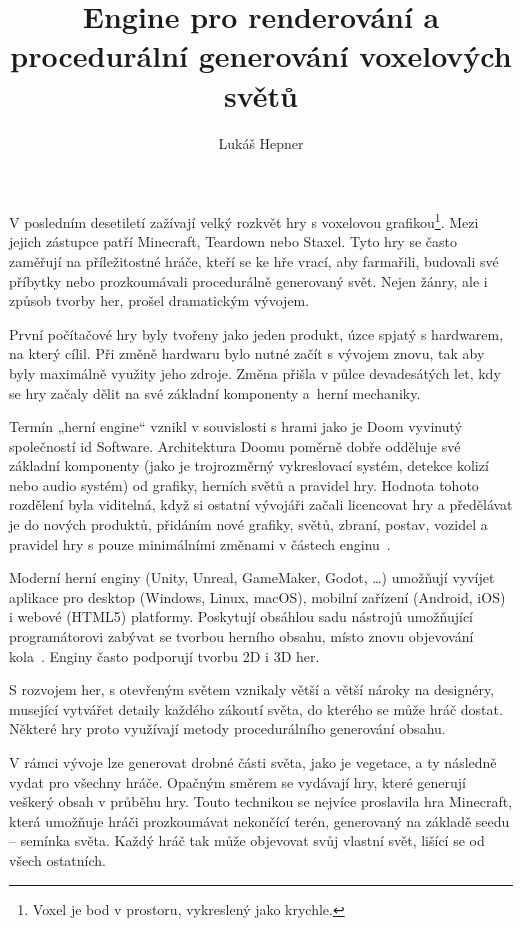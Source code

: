 \documentclass[thesis=M,czech]{FITthesis}[2019/12/23]
\title{Engine pro renderování a procedurální generování voxelových světů}
\author{Lukáš Hepner} %
\begin{document}

\begin{introduction}
V posledním desetiletí zažívají velký rozkvět hry s voxelovou grafikou\footnote{Voxel je bod v prostoru, vykreslený jako krychle.}. Mezi jejich zástupce patří Minecraft, Teardown nebo Staxel. Tyto hry se často zaměřují na příležitostné hráče, kteří se ke hře vrací, aby farmařili, budovali své příbytky nebo prozkoumávali procedurálně generovaný svět. Ne\-jen žánry, ale i způsob tvorby her, prošel dramatickým vývojem.

První počítačové hry byly tvořeny jako jeden produkt, úzce spjatý s hardwarem, na který cílil. Při změně hardwaru bylo nutné začít s vývojem znovu, tak aby byly maximálně využity jeho zdroje. Změna přišla v půlce devadesátých let, kdy se hry začaly dělit na své základní komponenty a~herní mechaniky.

Termín „herní engine“ vznikl v souvislosti s hrami jako je Doom vyvinutý společností id Software. Architektura Doomu poměrně dobře odděluje své základní komponenty (jako je trojrozměrný vykreslovací systém, detekce kolizí nebo audio systém) od grafiky, herních světů a pravidel hry. Hodnota tohoto rozdělení byla viditelná, když si ostatní vývojáři začali licencovat hry a předělávat je do nových produktů, přidáním nové grafiky, světů, zbraní, postav, vozidel a pravidel hry s pouze minimálními změnami v částech enginu~\cite{gea_11}.

Moderní herní enginy (Unity, Unreal, GameMaker, Godot, \dots) umožňují vyvíjet aplikace pro desktop (Windows, Linux, \mbox{macOS}), mobilní zařízení (Android, iOS) i webové (HTML5) platformy. Poskytují obsáhlou sadu nástrojů umožňující programátorovi zabývat se tvorbou herního obsahu, místo znovu objevování kola~\cite{godot_intro}. Enginy často podporují tvorbu 2D i 3D her.

S rozvojem her, s otevřeným světem vznikaly větší a větší nároky na designéry, musející vytvářet detaily každého zákoutí světa, do kterého se může hráč dostat. Některé hry proto využívají metody procedurálního generování obsahu.

V rámci vývoje lze generovat drobné části světa, jako je vegetace, a ty následně vydat pro všechny hráče. Opačným směrem se vydávají hry, které generují veškerý obsah v průběhu hry. Touto technikou se nejvíce proslavila hra Minecraft, která umožňuje hráči prozkoumávat nekončící terén, generovaný na základě seedu -- semínka světa. Každý hráč tak může objevovat svůj vlastní svět, lišící se od všech ostatních. 


\end{introduction}
\end{document}
